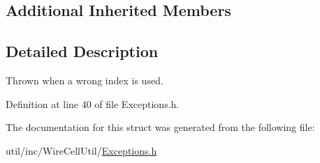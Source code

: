 \subsection*{Additional Inherited Members}


\subsection{Detailed Description}
Thrown when a wrong index is used. 

Definition at line 40 of file Exceptions.\+h.



The documentation for this struct was generated from the following file\+:\begin{DoxyCompactItemize}
\item 
util/inc/\+Wire\+Cell\+Util/\hyperlink{_exceptions_8h}{Exceptions.\+h}\end{DoxyCompactItemize}

